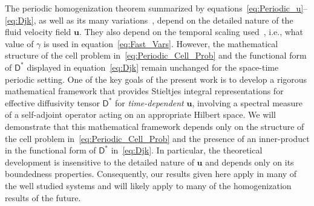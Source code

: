 \documentclass[leqno,onefignum,onetabnum]{siamltex1213}
\newcommand{\Dm}{\mathsf{D}}
\newcommand{\vecu}{\boldsymbol{u}}
\begin{document}
The periodic homogenization theorem summarized by
equations~\eqref{eq:Periodic_u}--\eqref{eq:Djk}, as well as its many
variations~\cite{Bensoussan:Book:1978,Papanicolaou:1981:36:8,Bhattacharya:1985:AnnProb:13:2:385,Bhattacharya:1989:ASD,McLaughlin:SIAM_JAM:780,Avellaneda:CMP-339,Pavliotis:PHD_Thesis,Pavliotis:IMAJAM:951,Pavliotis:CMS:2007:507,McLaughlin:Forest:PF:1999:880,Majda:Kramer:1999:book}, 
depend on the detailed nature of the fluid velocity field
$\vecu$. They also depend on the temporal scaling
used~\cite{Bhattacharya:1989:ASD,Pavliotis:PHD_Thesis,Majda:Kramer:1999:book},
i.e., what value of $\gamma$ is used in
equation~\eqref{eq:Fast_Vars}. However, the mathematical structure of
the cell problem in~\eqref{eq:Periodic_Cell_Prob} and the functional
form of $\Dm^*$ displayed in equation~\eqref{eq:Djk} remain
unchanged for the space-time periodic setting. One of the key goals of
the present work is to develop a rigorous mathematical framework that
provides Stieltjes integral representations for effective diffusivity
tensor $\Dm^*$ for \emph{time-dependent} $\vecu$, involving a spectral
measure of a self-adjoint operator acting on an appropriate Hilbert
space. We will demonstrate that this 
mathematical framework depends only on the structure of the cell
problem in~\eqref{eq:Periodic_Cell_Prob} and the presence of an
inner-product in the functional form of $\Dm^*$ in~\eqref{eq:Djk}. In
particular, the theoretical development is 
insensitive to the detailed nature of $\vecu$ and depends only
on its boundedness properties. Consequently, our results given here
apply in many of the well studied systems and will likely apply to
many of the homogenization results of the future.         
\end{document}
